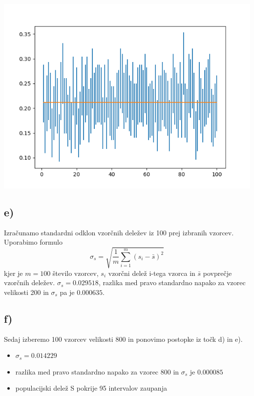 \documentclass[A4paper, 11pt]{article}
\begin{document}
\includegraphics[scale=0.8]{Kibergrad_1}

\subsection*{e)}
Izračunamo standardni odklon vzorčnih deležev  iz 100 prej izbranih vzorcev. Uporabimo formulo
\[ \sigma_s = \sqrt{\frac{1}{m} \sum_{i=1}^{m} (s_i - \bar{s})^2} \] 
kjer je $m=100$ število vzorcev, $s_i$ vzorčni delež i-tega vzorca in $\bar{s}$ povprečje vzorčnih deležev. 
$\sigma_s = 0.029518$, razlika med pravo standardno napako za vzorec velikosti 200 in $\sigma_s$ pa je $0.000635$.

\newpage

\subsection*{f)}
Sedaj izberemo 100 vzorcev velikosti 800 in ponovimo postopke iz točk d) in e).
\begin{itemize}
\item $\sigma_s = 0.014229$
\item razlika med pravo standardno napako za vzorec 800 in $\sigma_s$ je $0.000085$
\item populacijski delež S pokrije 95 intervalov zaupanja
\end{itemize}
\end{document}
